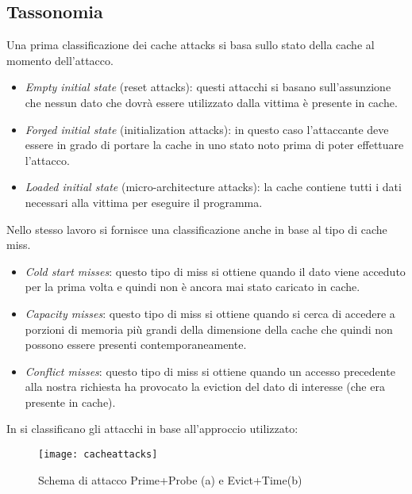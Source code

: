 		\subsection{Tassonomia}
			Una prima classificazione dei cache attacks si basa sullo stato della cache al momento dell'attacco\cite{canteaut2006understanding}.
			
			\begin{itemize}
				\item \emph{Empty initial state} (reset attacks): questi attacchi si basano sull'assunzione che nessun dato che dovrà essere utilizzato dalla vittima è presente in cache.
				\item \emph{Forged initial state} (initialization attacks): in questo caso l'attaccante deve essere in grado di portare la cache in uno stato noto prima di poter effettuare l'attacco.
				\item \emph{Loaded initial state} (micro-architecture attacks): la cache contiene tutti i dati necessari alla vittima per eseguire il programma.
			\end{itemize}
		
			Nello stesso lavoro si fornisce una classificazione anche in base al tipo di cache miss. 
			
			\begin{itemize}
				\item \emph{Cold start misses}: questo tipo di miss si ottiene quando il dato viene acceduto per la prima volta e quindi non è ancora mai stato caricato in cache.
				\item \emph{Capacity misses}: questo tipo di miss si ottiene quando si cerca di accedere a porzioni di memoria più grandi della dimensione della cache che quindi non possono essere presenti contemporaneamente.
				\item \emph{Conflict misses}: questo tipo di miss si ottiene quando un accesso precedente alla nostra richiesta ha provocato la eviction del dato di interesse (che era presente in cache).
			\end{itemize}
			
			In \cite{lipp2016armageddon,ge2016survey} si classificano gli attacchi in base all'approccio utilizzato:
			
			\begin{figure}
				\begin{center}
					\texttt{[image: cacheattacks]}
					\caption{Schema di attacco Prime+Probe (a) e Evict+Time(b)}
					\label{fig:cacheattacks}
				\end{center}
			\end{figure}
			
